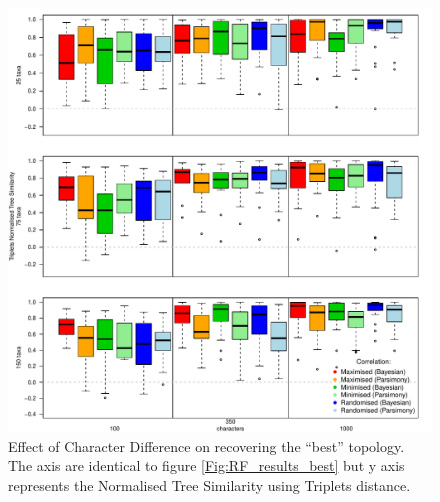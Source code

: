 \documentclass[12pt,letterpaper]{article}
\begin{document}
\begin{figure}[!htbp]
\centering
   \includegraphics[width=1\textwidth]{Figures/Tr_results_best.pdf} %
\caption{Effect of Character Difference on recovering the ``best'' topology. The axis are identical to figure \ref{Fig:RF_results_best} but y axis represents the Normalised Tree Similarity using Triplets distance.}
\label{Fig:Tr_results_best}
\end{figure}
\end{document}
